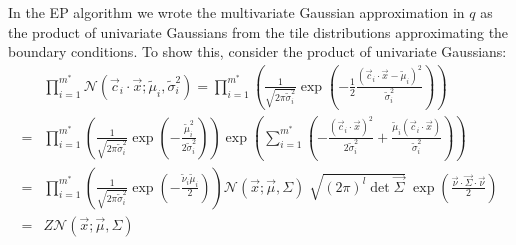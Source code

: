 \documentclass[11pt,twoside]{report}
\begin{document}
In the EP algorithm we wrote the multivariate Gaussian approximation in $q$ as the product of univariate Gaussians from the tile distributions approximating the boundary conditions.
To show this, consider the product of univariate Gaussians:
\begin{align}
    &
    \prod_{i=1}^{m^*}
    \mathcal{N}(\vec{c}_i \cdot \vec{x}; \widetilde{\mu}_i, \widetilde{\sigma}_i^2)
    =
    \prod_{i=1}^{m^*}
    \left(
    \frac{1}{\sqrt{ 2\pi \widetilde{\sigma}_i^2 }}
    \exp{\left(
      - \frac{1}{2} \frac{(\vec{c}_i \cdot \vec{x} - \widetilde{\mu}_i)^2}{\widetilde{\sigma}_i^2}
      \right)}
    \right)
    \nonumber \\ =&
    \prod_{i=1}^{m^*}
    \left(
    \frac{1}{\sqrt{ 2\pi \widetilde{\sigma}_i^2 }}
    \exp{\left(-\frac{\widetilde{\mu}_i^2}{2\widetilde{\sigma}_i^2}\right)}
    \right)
    \exp{\left( \sum_{i=1}^{m^*} \left(
      - \frac{(\vec{c}_i \cdot \vec{x})^2}{2\widetilde{\sigma}_i^2}
      + \frac{\widetilde{\mu}_i(\vec{c}_i \cdot \vec{x})}{\widetilde{\sigma}_i^2}
      \right) \right)}
    \nonumber \\ =&
    \prod_{i=1}^{m^*}
    \left(
    \frac{1}{\sqrt{ 2\pi \widetilde{\sigma}_i^2 }}
    \exp{\left(-\frac{\widetilde{\nu}_i \widetilde{\mu}_i}{2}\right)}
    \right)
    \mathcal{N}(\vec{x}; \vec{\mu}, \Sigma)
    \;
    \sqrt{ (2\pi)^l \det{\vec{\Sigma}} }
    \;
    \exp{\left( \frac{\vec{\nu} \cdot \vec{\Sigma} \cdot \vec{\nu}}{2} \right)}
    \nonumber \\ =&
    Z \mathcal{N}(\vec{x}; \vec{\mu}, \Sigma)
  \label{eq:combined-normals}
\end{align}
\end{document}
